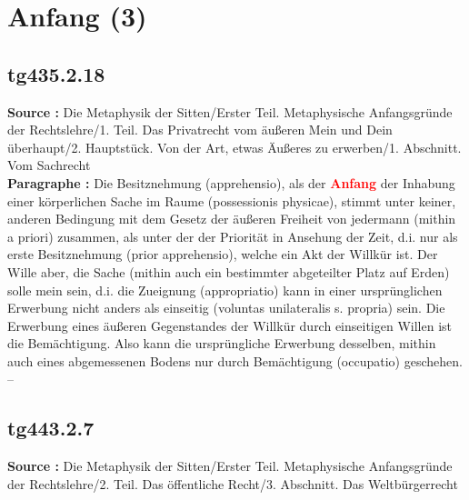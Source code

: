 \documentclass[a4paper,12pt,twoside]{book}
\newcommand{\match}[1]{\textcolor{red}{\textbf{#1}}}
\newcommand{\unnumberedsection}[1]{
	\section*{#1}
	\addcontentsline{toc}{section}{#1}
	\markright{#1}
}
\begin{document}
	\unnumberedsection{Anfang (3)} 
	\subsection*{tg435.2.18} 
	\textbf{Source : }Die Metaphysik der Sitten/Erster Teil. Metaphysische Anfangsgründe der Rechtslehre/1. Teil. Das Privatrecht vom äußeren Mein und Dein überhaupt/2. Hauptstück. Von der Art, etwas Äußeres zu erwerben/1. Abschnitt. Vom Sachrecht\\  
	
	\textbf{Paragraphe : }Die Besitznehmung (apprehensio), als der \match{Anfang} der Inhabung einer körperlichen Sache im Raume (possessionis physicae), stimmt unter keiner, anderen Bedingung mit dem Gesetz der äußeren Freiheit von jedermann (mithin a priori) zusammen, als unter der der Priorität in Ansehung der Zeit, d.i. nur als erste Besitznehmung (prior apprehensio), welche ein Akt der Willkür ist. Der Wille aber, die Sache (mithin auch ein bestimmter abgeteilter Platz auf Erden) solle mein sein, d.i. die Zueignung (appropriatio) kann in einer ursprünglichen Erwerbung nicht anders als einseitig (voluntas unilateralis s. propria) sein. Die Erwerbung eines äußeren Gegenstandes der Willkür durch einseitigen  Willen ist die Bemächtigung. Also kann die ursprüngliche Erwerbung desselben, mithin auch eines abgemessenen Bodens nur durch Bemächtigung (occupatio) geschehen. – 
	
	\subsection*{tg443.2.7} 
	\textbf{Source : }Die Metaphysik der Sitten/Erster Teil. Metaphysische Anfangsgründe der Rechtslehre/2. Teil. Das öffentliche Recht/3. Abschnitt. Das Weltbürgerrecht\\  
	
\end{document}

